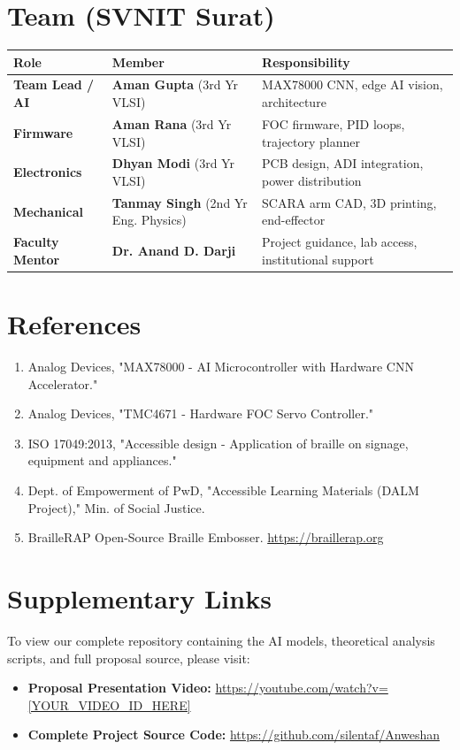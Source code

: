 \documentclass[11pt,a4paper]{article}
\begin{document}
\section{Team (SVNIT Surat)}

\begin{table}[H]
\centering
\begin{tabularx}{\textwidth}{llX}
\toprule
\textbf{Role} & \textbf{Member} & \textbf{Responsibility} \\
\midrule
\textbf{Team Lead / AI} & \textbf{Aman Gupta} (3rd Yr VLSI) & MAX78000 CNN, edge AI vision, architecture \\
\textbf{Firmware} & \textbf{Aman Rana} (3rd Yr VLSI) & FOC firmware, PID loops, trajectory planner \\
\textbf{Electronics} & \textbf{Dhyan Modi} (3rd Yr VLSI) & PCB design, ADI integration, power distribution \\
\textbf{Mechanical} & \textbf{Tanmay Singh} (2nd Yr Eng. Physics) & SCARA arm CAD, 3D printing, end-effector \\
\textbf{Faculty Mentor} & \textbf{Dr. Anand D. Darji} & Project guidance, lab access, institutional support \\
\bottomrule
\end{tabularx}
\end{table}

\section{References}
\begin{enumerate}[noitemsep]
    \item Analog Devices, "MAX78000 - AI Microcontroller with Hardware CNN Accelerator."
    \item Analog Devices, "TMC4671 - Hardware FOC Servo Controller."
    \item ISO 17049:2013, "Accessible design - Application of braille on signage, equipment and appliances."
    \item Dept. of Empowerment of PwD, "Accessible Learning Materials (DALM Project)," Min. of Social Justice.
    \item BrailleRAP Open-Source Braille Embosser. \url{https://braillerap.org}
\end{enumerate}

\section{Supplementary Links}
To view our complete repository containing the AI models, theoretical analysis scripts, and full proposal source, please visit:
\begin{itemize}[noitemsep]
    \item \textbf{Proposal Presentation Video:} \url{https://youtube.com/watch?v=[YOUR_VIDEO_ID_HERE]}
    \item \textbf{Complete Project Source Code:} \url{https://github.com/silentaf/Anweshan}
\end{itemize}
\end{document}
